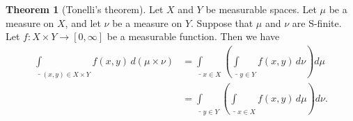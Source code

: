 \documentclass{article}
\theoremstyle{definition}
\newtheorem{theorem}{Theorem}[section]
\begin{document}
\begin{theorem}[Tonelli's theorem]
  Let $X$ and $Y$ be measurable spaces.
  Let $\mu$ be a measure on $X$,
  and let $\nu$ be a measure on $Y$.
  Suppose that $\mu$ and $\nu$ are S-finite.
  Let $f : X \times Y \to [0, \infty]$ be a measurable function.
  Then we have
  \begin{align*}
    \underline{\int}_{(x,y) \in X \times Y} f (x,y) \, d(\mu \times \nu)
      &= \underline{\int}_{x \in X} \left(
          \underline{\int}_{y \in Y} f (x,y) \, d\nu
        \right) d\mu \\
      &= \underline{\int}_{y \in Y} \left(
          \underline{\int}_{x \in X} f (x,y) \, d\mu
        \right) d\nu.
  \end{align*}
\end{theorem}
\end{document}
